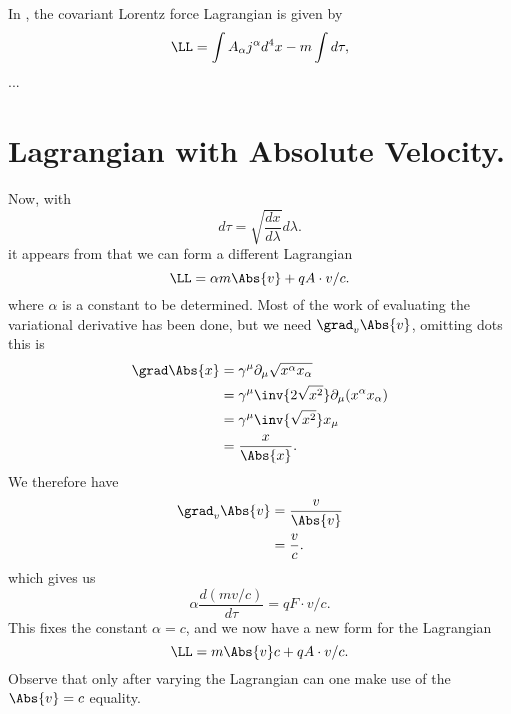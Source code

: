 In \citep{poisson1999ild},
the covariant Lorentz force Lagrangian is given by
%
\begin{equation}\label{eqn:lforceLag2:poissonLag}
\LL = \int A_\alpha j^\alpha d^4 x - m \int d\tau,
\end{equation}
%
...
\section{Lagrangian with Absolute Velocity.}
%
Now, with
%
\begin{equation}\label{eqn:lForceLag2:240}
d\tau = \sqrt{\frac{dx}{d\lambda}} d\lambda.
\end{equation}
%
it appears from
that we can form a different Lagrangian
%
\begin{equation}\label{eqn:lForceLag2:260}
\LL = \alpha m \Abs{v} + q A \cdot v/c.
\end{equation}
%
where \(\alpha\) is a constant to be determined.  Most of the work of evaluating the variational derivative has been done, but we need \(\grad_v \Abs{v}\), omitting dots this is
%
\begin{equation}\label{eqn:lForceLag2:280}
\begin{aligned}
\grad \Abs{x}
&= \gamma^\mu \partial_\mu \sqrt{x^\alpha x_\alpha} \\
&= \gamma^\mu \inv{2 \sqrt{x^2}} \partial_\mu (x^\alpha x_\alpha) \\
&= \gamma^\mu \inv{\sqrt{x^2}} x_\mu \\
&= \frac{x}{\Abs{x}}.
\end{aligned}
\end{equation}
%
We therefore have
%
\begin{equation}\label{eqn:lForceLag2:300}
\begin{aligned}
\grad_v \Abs{v}
&= \frac{v}{\Abs{v}} \\
&= \frac{v}{c} .
\end{aligned}
\end{equation}
%
which gives us
\begin{equation}\label{eqn:lForceLag2:320}
\alpha \frac{d(mv/c)}{d\tau} = q F \cdot v/c.
\end{equation}
%
This fixes the constant \(\alpha = c\), and we now have a new form for the Lagrangian
%
\begin{equation}\label{eqn:lForceLag2:340}
\LL = m \Abs{v} c + q A \cdot v/c.
\end{equation}
%
Observe that only after varying the Lagrangian can one make use of the \(\Abs{v} = c\) equality.
%
%
%
%
%
%
